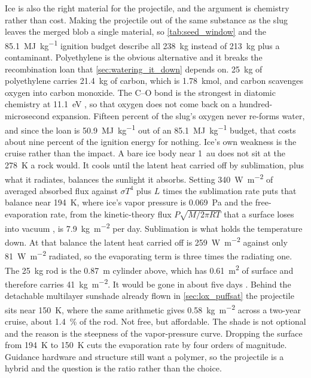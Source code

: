 \documentclass{article}
\begin{document}
Ice is also the right material for the projectile, and the argument is chemistry rather than cost. Making the projectile out of the same substance as the slug leaves the merged blob a single material, so \autoref{tab:seed_window} and the \SI{85.1}{\mega\joule\per\kilogram} ignition budget describe all \SI{238}{\kilogram} instead of \SI{213}{\kilogram} plus a contaminant. Polyethylene is the obvious alternative and it breaks the recombination loan that \autoref{sec:watering_it_down} depends on. \SI{25}{\kilogram} of polyethylene carries \SI{21.4}{\kilogram} of carbon, which is \SI{1.78}{\kilo\mole}, and carbon scavenges oxygen into carbon monoxide. The C--O bond is the strongest in diatomic chemistry at \SI{11.1}{\electronvolt} \cite{crc_handbook}, so that oxygen does not come back on a hundred-microsecond expansion. Fifteen percent of the slug's oxygen never re-forms water, and since the loan is \SI{50.9}{\mega\joule\per\kilogram} out of an \SI{85.1}{\mega\joule\per\kilogram} budget, that costs about nine percent of the ignition energy for nothing. Ice's own weakness is the cruise rather than the impact. A bare ice body near \SI{1}{\astronomicalunit} does not sit at the \SI{278}{\kelvin} a rock would. It cools until the latent heat carried off by sublimation, plus what it radiates, balances the sunlight it absorbs. Setting \SI{340}{\watt\per\square\meter} of averaged absorbed flux against $\sigma T^4$ plus $L$ times the sublimation rate puts that balance near \SI{194}{\kelvin}, where ice's vapor pressure is \SI{0.069}{\pascal} \cite{marti1993ice} and the free-evaporation rate, from the kinetic-theory flux $P\sqrt{M/2\pi R T}$ that a surface loses into vacuum \cite{knudsen1915verdampfung}, is \SI{7.9}{\kilogram\per\square\meter} per day. Sublimation is what holds the temperature down. At that balance the latent heat carried off is \SI{259}{\watt\per\square\meter} against only \SI{81}{\watt\per\square\meter} radiated, so the evaporating term is three times the radiating one. The \SI{25}{\kilogram} rod is the \SI{0.87}{\meter} cylinder above, which has \SI{0.61}{\square\meter} of surface and therefore carries \SI{41}{\kilogram\per\square\meter}. It would be gone in about five days \cite{Katz_aim_is_all_you_need_2025}. Behind the detachable multilayer sunshade already flown in \autoref{sec:lox_puffsat} the projectile sits near \SI{150}{\kelvin}, where the same arithmetic gives \SI{0.58}{\kilogram\per\square\meter} across a two-year cruise, about \SI{1.4}{\percent} of the rod. Not free, but affordable. The shade is not optional and the reason is the steepness of the vapor-pressure curve. Dropping the surface from \SI{194}{\kelvin} to \SI{150}{\kelvin} cuts the evaporation rate by four orders of magnitude. Guidance hardware and structure still want a polymer, so the projectile is a hybrid and the question is the ratio rather than the choice.
\end{document}
